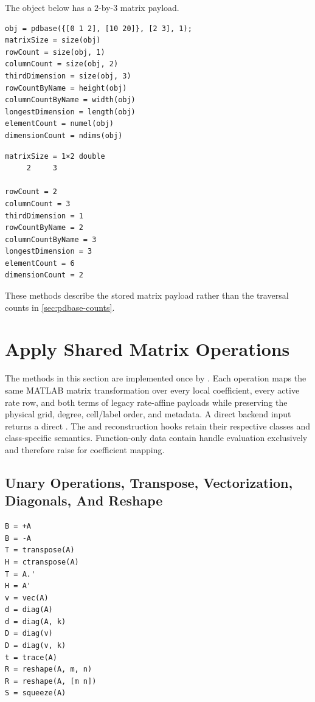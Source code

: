 \examplehead
The object below has a $2$-by-$3$ matrix payload.

\begin{lstlisting}[style=dpmatlab]
obj = pdbase({[0 1 2], [10 20]}, [2 3], 1);
matrixSize = size(obj)
rowCount = size(obj, 1)
columnCount = size(obj, 2)
thirdDimension = size(obj, 3)
rowCountByName = height(obj)
columnCountByName = width(obj)
longestDimension = length(obj)
elementCount = numel(obj)
dimensionCount = ndims(obj)
\end{lstlisting}

\begin{lstlisting}[style=dpoutput]
matrixSize = 1×2 double
     2     3

rowCount = 2
columnCount = 3
thirdDimension = 1
rowCountByName = 2
columnCountByName = 3
longestDimension = 3
elementCount = 6
dimensionCount = 2
\end{lstlisting}

\remarkshead
These methods describe the stored matrix payload rather than the traversal counts in \cref{sec:pdbase-counts}.

\section{Apply Shared Matrix Operations}
\label{sec:pdbase-matrix-ops}

The methods in this section are implemented once by . Each operation maps the same MATLAB matrix transformation over every local coefficient, every active rate row, and both terms of legacy rate-affine payloads while preserving the physical grid, degree, cell/label order, and metadata. A direct backend input returns a direct . The  and  reconstruction hooks retain their respective classes and class-specific semantics. Function-only  data contain handle evaluation exclusively and therefore raise  for coefficient mapping.

\subsection{Unary Operations, Transpose, Vectorization, Diagonals, And Reshape}
\label{sec:pdbase-unary-matrix-ops}

\syntaxhead
\begin{lstlisting}[style=dpsyntax]
B = +A
B = -A
T = transpose(A)
H = ctranspose(A)
T = A.'
H = A'
v = vec(A)
d = diag(A)
d = diag(A, k)
D = diag(v)
D = diag(v, k)
t = trace(A)
R = reshape(A, m, n)
R = reshape(A, [m n])
S = squeeze(A)
\end{lstlisting}

